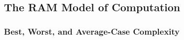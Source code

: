 \subsection{The RAM Model of Computation}

\subsubsection{Best, Worst, and Average-Case Complexity}

